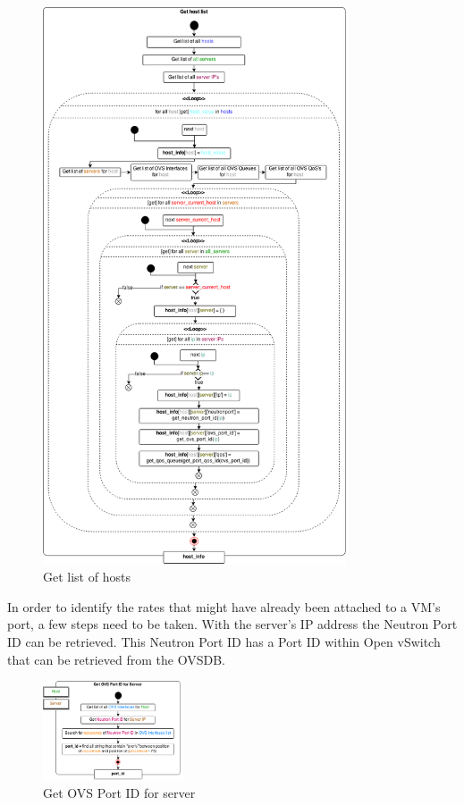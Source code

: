 \begin{figure}[H]
\centering

\includegraphics[width=0.8\textwidth]{images/implementation/cma_host_list}

\caption{Get list of hosts}
\end{figure}

In order to identify the rates that might have already been attached to a VM's port, a few steps need to be taken. With the server's IP address the Neutron Port ID can be retrieved. This Neutron Port ID has a Port ID within Open vSwitch that can be retrieved from the OVSDB. 

\begin{figure}[H]
\centering

\includegraphics[width=0.37\textwidth]{images/implementation/cma_get_ovs_port_server}

\caption{Get OVS Port ID for server}
\end{figure}

